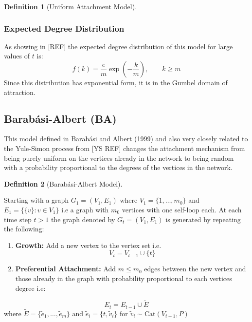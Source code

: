 \documentclass[
  10pt,
  a4paper,
]{scrreprt}
\providecommand{\tightlist}{%
  \setlength{\itemsep}{0pt}\setlength{\parskip}{0pt}}\usepackage{longtable,booktabs,array}
\theoremstyle{plain}
\theoremstyle{definition}
\newtheorem{definition}{Definition}[section]
\theoremstyle{remark}
\begin{document}
{\begin{definition}[Uniform Attachment
Model]
\end{definition}

\hypertarget{expected-degree-distribution}{%
\subsubsection{Expected Degree
Distribution}\label{expected-degree-distribution}}

As showing in {[}REF{]} the expected degree distribution of this model
for large values of \(t\) is: \[
f(k) = \frac{e}{m}\exp\left(-\frac{k}{m}\right),\qquad k \ge m
\] Since this distribution has exponential form, it is in the Gumbel
domain of attraction.

\hypertarget{barabuxe1si-albert-ba}{%
\subsection{Barabási-Albert (BA)}\label{barabuxe1si-albert-ba}}

This model defined in Barabási and Albert (1999) and also very closely
related to the Yule-Simon process from {[}YS REF{]} changes the
attachment mechanism from being purely uniform on the vertices already
in the network to being random with a probability proportional to the
degrees of the vertices in the network.

\begin{definition}[Barabási-Albert
Model]\protect\hypertarget{def-ba}{}\label{def-ba}

Starting with a graph \(G_1 = (V_1, E_1)\) where
\(V_1 = \{1,\ldots,m_0\}\) and \(E_1 = \{\{v\}:v\in V_1\}\) i.e a graph
with \(m_0\) vertices with one self-loop each. At each time step \(t>1\)
the graph denoted by \(G_t = (V_1, E_1)\) is generated by repeating the
following:

\begin{enumerate}
\def\labelenumi{\arabic{enumi}.}
\tightlist
\item
  \textbf{Growth:} Add a new vertex to the vertex set i.e. \[
  V_t = V_{t-1} \cup \{t\}
  \]
\item
  \textbf{Preferential Attachment:} Add \(m\le m_0\) edges between the
  new vertex and those already in the graph with probability
  proportional to each vertices degree i.e:
\end{enumerate}

\[
E_t= E_{t-1} \cup \tilde E
\] where \(\tilde E = \{\tilde e_1,\ldots, \tilde e_m\}\) and
\(\tilde e_i = \{t,\tilde v_i\}\) for
\(\tilde v_i \sim \text{Cat}(V_{t-1}, P)\)


\end{definition}}
\end{document}
